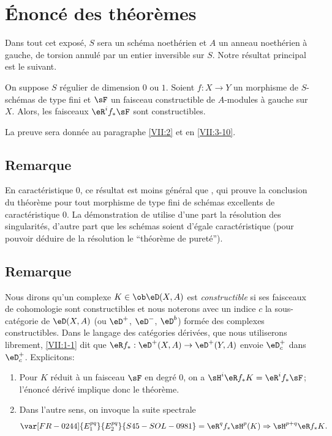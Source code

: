 \section{Énoncé des théorèmes}\label{VII:1}

Dans tout cet exposé, $S$ sera un schéma noethérien et $A$ un anneau 
noethérien à gauche, de torsion annulé par un entier inversible sur $S$. 
Notre résultat principal est le suivant. 





\begin{theorem_}\label{VII:1-1}
On suppose $S$ régulier de dimension $0$ ou $1$. Soient $f:X\to Y$ un 
morphisme de $S$-schémas de type fini et $\sF$ un faisceau constructible de 
$A$-modules à gauche sur $X$. Alors, les faisceaux $\eR^i f_\ast \sF$ sont 
constructibles. 
\end{theorem_}

La preuve sera donnée au paragraphe \ref{VII:2} et en \ref{VII:3-10}. 





\subsection{Remarque}\label{VII:1-2}

En caractéristique $0$, ce résultat est moins général que 
, qui prouve la conclusion du théorème pour 
tout morphisme de type fini de schémas excellents de caractéristique $0$. 
La démonstration de  utilise d'une part la résolution des  
singularités, d'autre part que les schémas soient d'égale 
caractéristique (pour pouvoir déduire de la résolution le ``théorème 
de pureté''). 






\subsection{Remarque}\label{VII:1-3}

Nous dirons qu'un complexe $K\in\ob\eD(X,A)$ est \emph{constructible} si ses 
faisceaux de cohomologie sont constructibles et nous noterons avec un indice 
$c$ la sous-catégorie de $\eD(X,A)$ (ou $\eD^+$, $\eD^-$, $\eD^b$) formée 
des complexes constructibles. Dans le langage des catégories dérivées, 
que nous utiliserons librement, \ref{VII:1-1} dit que 
$\eR f_\ast:\eD^+(X,A) \to \eD^+(Y,A)$ envoie $\eD_c^+$ dans $\eD_c^+$. 
Explicitons: 
\begin{enumerate}[\indent a)]
  \item Pour $K$ réduit à un faisceau $\sF$ en degré $0$, on a 
    $\sH^i\eR f_\ast K = \eR^i f_\ast \sF$; l'énoncé dérivé implique 
    donc le théorème. 
  \item Dans l'autre sens, on invoque la suite spectrale 
    \[
      \var[FR-0244]{E_1^{p q}}{E_2^{p q}}{S45-SOL-0981} = \eR^q f_\ast \sH^p(K) \Rightarrow \sH^{p+q} \eR f_\ast K \text{.} 
    \]
\end{enumerate}

